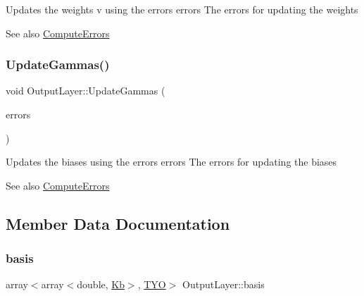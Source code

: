 Updates the weights v using the errors  errors The errors for updating the weights \begin{DoxySeeAlso}{See also}
\mbox{\hyperlink{class_output_layer_ab3a0791041b3e677d80d353c6109a7c6}{Compute\+Errors}} 
\end{DoxySeeAlso}
\mbox{\label{class_output_layer_a622d1f007ffa90246d823b8a74bc2db1}} 
\subsubsection{\texorpdfstring{Update\+Gammas()}{UpdateGammas()}}
{\footnotesize\ttfamily void Output\+Layer\+::\+Update\+Gammas (\begin{DoxyParamCaption}\item[{array$<$ array$<$ double, \mbox{\hyperlink{_constants_8h_a6108cec236ef7a2e1d3259931de87186}{T}} $>$, \mbox{\hyperlink{_constants_8h_a12148c0e36153a905f4f6ef1afdbb27e}{C\+L\+A\+S\+S\+ES}} $>$ \&}]{errors }\end{DoxyParamCaption})}

Updates the biases using the errors  errors The errors for updating the biases \begin{DoxySeeAlso}{See also}
\mbox{\hyperlink{class_output_layer_ab3a0791041b3e677d80d353c6109a7c6}{Compute\+Errors}} 
\end{DoxySeeAlso}


\subsection{Member Data Documentation}
\mbox{\label{class_output_layer_af1e4ba231ebb2ceb46a6349d4ee57f9c}} 
\subsubsection{\texorpdfstring{basis}{basis}}
{\footnotesize\ttfamily array$<$array$<$double, \mbox{\hyperlink{_constants_8h_ad3e444d768e5365a1620b7b5702c4eb8}{Kb}}$>$, \mbox{\hyperlink{_constants_8h_ade2b686fe2ed5231b32fced73d812981}{T\+YO}}$>$ Output\+Layer\+::basis\hspace{0.3cm}{\ttfamily [protected]}}

